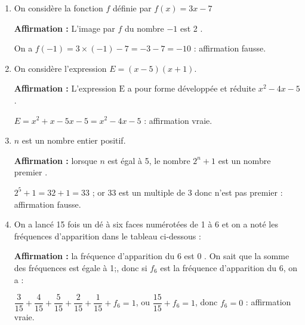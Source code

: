 

\medskip


\begin{enumerate}[itemsep=5mm]
	\item On considère la fonction $f$ définie par $f(x) = 3x - 7$
	
	\textbf{Affirmation  :} \og{}L'image par $f$ du nombre $-1$ est 2 \fg{}.
	
	On a $f(- 1) = 3 \times (- 1) - 7 = - 3 - 7 = - 10$ : affirmation fausse.
	
	\item On considère l'expression $E = (x - 5)(x + 1)$.
	
	\textbf{Affirmation  :} \og{} L'expression $ \mathrm{E} $ a pour forme développée et réduite $x^2 - 4x - 5 $\fg.
	
$E = x^2  + x - 5x - 5 = x^2 - 4x - 5$ : affirmation vraie.
	
	\item $n$ est un nombre entier positif.
	
	\textbf{Affirmation  :} \og{}lorsque $n$ est égal à 5, le nombre $2^n +1$ est un nombre premier \fg{}.

$2^5 + 1 = 32 + 1 = 33$ ; or 33 est un multiple de 3 donc n'est pas premier : affirmation fausse.	
	\item On a lancé 15 fois un dé à six faces numérotées de 1 à 6 et on a noté les fréquences d'apparition dans le tableau ci-dessous :
	
%	
	
	\textbf{Affirmation  :} \og{}la fréquence d'apparition du 6 est 0 \fg{}.
On sait que la somme des fréquences est égale à 1;, donc si $f_6$ est la fréquence d'apparition du 6, on a :

$\dfrac{3}{15} + \dfrac{4}{15} +\dfrac{5}{15} +\dfrac{2}{15} +\dfrac{1}{15} + f_6 = 1$, ou $\dfrac{15}{15} + f_6 = 1$, donc $f_6 = 0$ : affirmation vraie.
	

\end{enumerate}
